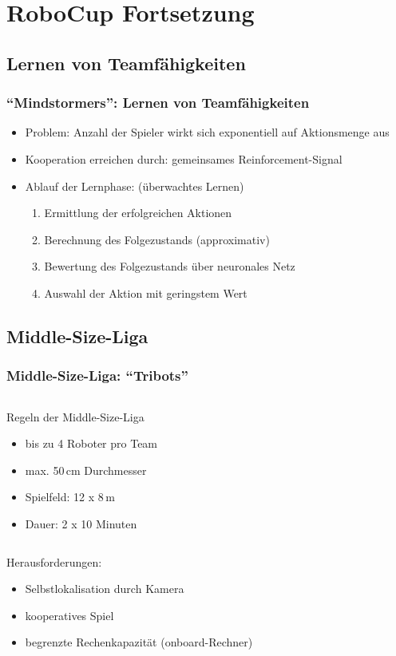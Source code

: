 \section{RoboCup Fortsetzung}
\subsection{Lernen von Teamfähigkeiten}
\begin{frame}
  \frametitle{"`Mindstormers"': Lernen von Teamfähigkeiten}

  \begin{itemize}
    \item Problem: Anzahl der Spieler wirkt sich exponentiell auf Aktionsmenge
    aus 
    \item Kooperation erreichen durch: gemeinsames Reinforcement-Signal
    \item Ablauf der Lernphase: (überwachtes Lernen)
	  \begin{enumerate}
        \item Ermittlung der erfolgreichen Aktionen
        \item Berechnung des Folgezustands (approximativ)
        \item Bewertung des Folgezustands über neuronales Netz
        \item Auswahl der Aktion mit geringstem Wert
	  \end{enumerate}
  \end{itemize}
\end{frame}

\subsection{Middle-Size-Liga}
\begin{frame}
  \frametitle{Middle-Size-Liga: "`Tribots"'}

  \begin{columns}[b]
	  \begin{block}{Regeln der Middle-Size-Liga}
	      \begin{itemize}
	        \item<2-> bis zu 4 Roboter pro Team
	        \item<2-> max. 50\,cm Durchmesser
	        \item<2-> Spielfeld: 12 x 8\,m
	        \item<2-> Dauer: 2 x 10 Minuten
	      \end{itemize}
	  \end{block}
  \end{columns}
  
  Herausforderungen:  
  \begin{itemize}
    \item Selbstlokalisation durch Kamera
    \item kooperatives Spiel
    \item begrenzte Rechenkapazität (onboard-Rechner)
  \end{itemize}
\end{frame}

